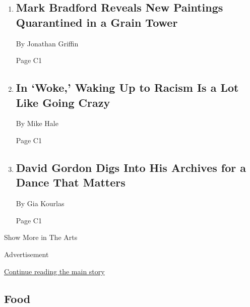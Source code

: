\begin{enumerate}
\def\labelenumi{\arabic{enumi}.}
\item
  \href{/2020/09/08/arts/design/mark-bradford-new-paintings-quarantine.html}{}

  \hypertarget{mark-bradford-reveals-new-paintings-quarantined-in-a-grain-tower-1}{%
  \subsection{Mark Bradford Reveals New Paintings Quarantined in a Grain
  Tower}\label{mark-bradford-reveals-new-paintings-quarantined-in-a-grain-tower-1}}

  By Jonathan Griffin

  Page C1
\item
  \href{/2020/09/08/arts/television/review-woke.html}{}

  \hypertarget{in-woke-waking-up-to-racism-is-a-lot-like-going-crazy}{%
  \subsection{In `Woke,' Waking Up to Racism Is a Lot Like Going
  Crazy}\label{in-woke-waking-up-to-racism-is-a-lot-like-going-crazy}}

  By Mike Hale

  Page C1
\item
  \href{/2020/09/08/arts/dance/david-gordon-philadelphia-matters.html}{}

  \hypertarget{david-gordon-digs-into-his-archives-for-a-dance-that-matters}{%
  \subsection{David Gordon Digs Into His Archives for a Dance That
  Matters}\label{david-gordon-digs-into-his-archives-for-a-dance-that-matters}}

  By Gia Kourlas

  Page C1
\end{enumerate}

Show More in The Arts

Advertisement

\protect\hyperlink{after-mid5}{Continue reading the main story}

\hypertarget{food}{%
\subsection{Food}\label{food}}

